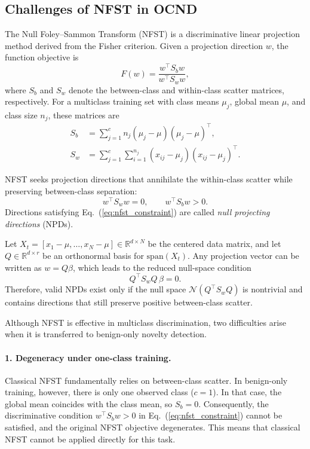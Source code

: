 \documentclass[final,twocolumn,10pt]{elsarticle}
\begin{document}
\subsection{Challenges of NFST in OCND}
\label{sec:nfst_challenges}

The Null Foley--Sammon Transform (NFST) is a discriminative linear projection method derived from the Fisher criterion. Given a projection direction $w$, the function objective is
\begin{equation}
F(w)=\frac{w^{\top}S_b w}{w^{\top}S_w w},
\label{eq:fisher}
\end{equation}
where $S_b$ and $S_w$ denote the between-class and within-class scatter matrices, respectively. For a multiclass training set with class means $\mu_j$, global mean $\mu$, and class size $n_j$, these matrices are
\begin{align}
S_b &= \sum_{j=1}^{c} n_j(\mu_j - \mu)(\mu_j - \mu)^{\top}, \\
S_w &= \sum_{j=1}^{c} \sum_{i=1}^{n_j} (x_{ij} - \mu_j)(x_{ij} - \mu_j)^{\top}.
\label{eq:scatter}
\end{align}

NFST seeks projection directions that annihilate the within-class scatter while preserving between-class separation:
\begin{equation}
w^{\top}S_w w = 0,
\qquad
w^{\top}S_b w > 0.
\label{eq:nfst_constraint}
\end{equation}
Directions satisfying Eq.~(\ref{eq:nfst_constraint}) are called \emph{null projecting directions} (NPDs).

Let $X_t=[x_1-\mu,\ldots,x_N-\mu]\in\mathbb{R}^{d\times N}$ be the centered data matrix, and let $Q\in\mathbb{R}^{d\times r}$ be an orthonormal basis for $\mathrm{span}(X_t)$. Any projection vector can be written as $w=Q\beta$, which leads to the reduced null-space condition
\begin{equation}
Q^{\top}S_w Q\,\beta = 0.
\label{eq:nullspace}
\end{equation}
Therefore, valid NPDs exist only if the null space $\mathcal{N}(Q^{\top}S_w Q)$ is nontrivial and contains directions that still preserve positive between-class scatter.

Although NFST is effective in multiclass discrimination, two difficulties arise when it is transferred to benign-only novelty detection.

\paragraph{1. Degeneracy under one-class training.}
Classical NFST fundamentally relies on between-class scatter. In benign-only training, however, there is only one observed class ($c=1$). In that case, the global mean coincides with the class mean, so $S_b=0$. Consequently, the discriminative condition $w^{\top}S_b w>0$ in Eq.~(\ref{eq:nfst_constraint}) cannot be satisfied, and the original NFST objective degenerates. This means that classical NFST cannot be applied directly for this task.
\end{document}
